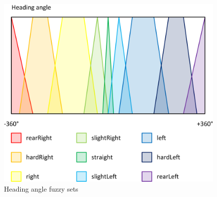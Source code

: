 \begin{figure}[H]
\centering
\caption{Heading angle fuzzy sets}
\includegraphics[scale=0.1]{./img/pdf/headingAngleSets.pdf}
\end{figure}